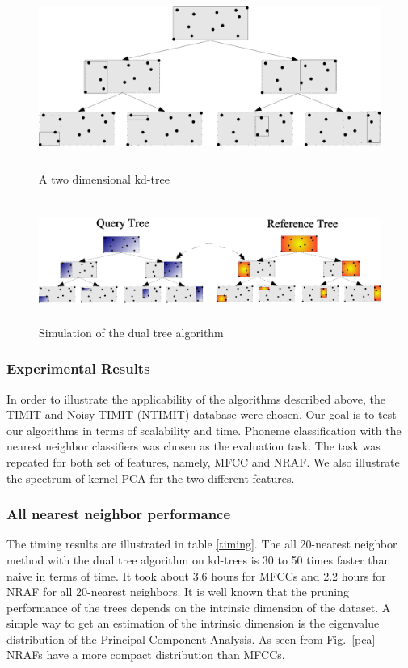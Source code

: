 \documentclass[12pt,letterpaper,doublespaced,ETD,dvips,proposal]{gtthesis}
\begin{document}
\begin{Body}
\begin{figure}[!htb]
\label{kdtree}
\centerline{\includegraphics[height=6cm]{kdtree.eps}}
\caption{A two dimensional kd-tree}
\end{figure}


\begin{figure}[!htb]
\label{dualkdtree}
\centerline{\includegraphics[height=4cm]{dualtree_recursion.eps}}
\caption{Simulation of the dual tree algorithm}
\end{figure}



\subsubsection{Experimental Results} In order to illustrate the
applicability of the algorithms described above, the TIMIT and Noisy
TIMIT (NTIMIT) database were chosen. Our goal is to test our
algorithms in terms of scalability and time. Phoneme classification
with the nearest neighbor classifiers was chosen as the evaluation
task. The task was repeated for both set of features, namely, MFCC
and NRAF. We also illustrate the spectrum of kernel PCA for the two
different features.

\subsubsection{All nearest neighbor performance}
The timing results are illustrated in table \ref{timing}. The all
20-nearest neighbor method with the dual tree algorithm on kd-trees
is 30 to 50 times faster than naive in terms of time. It took about
3.6 hours for MFCCs and 2.2 hours for NRAF for all 20-nearest
neighbors. It is well known that the pruning performance of the
trees depends on the intrinsic dimension of the dataset. A simple
way to get an estimation of the intrinsic dimension is the
eigenvalue distribution of the Principal Component Analysis. As seen
from Fig.~\ref{pca} NRAFs have a more compact distribution than
MFCCs.


\end{Body}
\end{document}
